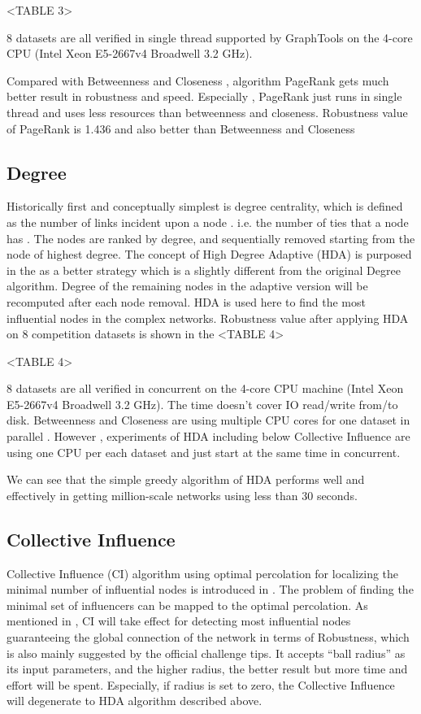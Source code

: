 \documentclass{article}
\begin{document}
	<TABLE 3>
	
	8 datasets are all verified in single thread supported by GraphTools \cite{peixotographtool2014} on the 4-core CPU (Intel Xeon E5-2667v4 Broadwell 3.2 GHz).
	
	Compared with Betweenness and Closeness , algorithm PageRank gets much better result in robustness and speed. Especially , PageRank just runs in single thread and uses less resources than betweenness and closeness. Robustness value of PageRank is 1.436 and also better than Betweenness and Closeness 
	
	\subsection{Degree}		

	Historically first and conceptually simplest is degree centrality, which is defined as the number of links incident upon a node . i.e. the number of ties that a node has \cite{wikiCentrality}. The nodes are ranked by degree, and sequentially removed starting from the node of highest degree. The concept of High Degree Adaptive (HDA) is purposed in the \cite{morone2015influence} as a better strategy which is a slightly different from the original Degree algorithm. Degree of the remaining nodes in the adaptive version will be recomputed after each node removal. HDA is used here to find the most influential nodes in the complex networks. Robustness value after applying HDA on 8 competition datasets is shown in the <TABLE 4>
	
	<TABLE 4>
	
	8 datasets are all verified in concurrent on the 4-core CPU machine (Intel Xeon E5-2667v4 Broadwell 3.2 GHz). The time doesn't cover IO read/write from/to disk. Betweenness and Closeness are using multiple CPU cores for one dataset in parallel . However , experiments of HDA including below Collective Influence are using one CPU per each dataset and just start at the same time in concurrent.
	
	We can see that the simple greedy algorithm of HDA performs well and effectively in getting million-scale networks using less than 30 seconds. 


	\subsection{Collective Influence}		

	Collective Influence (CI) algorithm using optimal percolation for localizing the minimal number of influential nodes is introduced in \cite{morone2015influence} \cite{morone2016collective}. The problem of finding the minimal set of influencers can be mapped to the optimal percolation. As mentioned in \cite{lu2016vital}, CI will take effect for detecting most influential nodes guaranteeing the global connection of the network in terms of Robustness, which is also mainly suggested by the official challenge tips. It accepts “ball radius” as its input parameters, and the higher radius, the better result but more time and effort will be spent. Especially, if radius is set to zero, the Collective Influence will degenerate to HDA algorithm described above.
	
\end{document}
